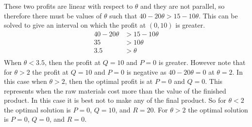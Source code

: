 \documentclass[11pt, oneside]{article}
\begin{document}
\begin{enumerate}
\begin{enumerate}
          These two profits are linear with respect to $\theta$ and they are
          not parallel, so therefore there must be values of $\theta$ such that
          $40 - 20\theta > 15 - 10\theta$.
          This can be solved to give an interval on which the profit at $(0, 10)$
          is greater.
          \begin{align*}
            40 - 20\theta &> 15 - 10\theta \\
            35 &> 10\theta \\
            3.5 &> \theta \\
          \end{align*}
          When $\theta < 3.5$, then the profit at $Q = 10$ and $P = 0$ is greater.
          However note that for $\theta > 2$ the profit at $Q = 10$ and $P = 0$
          is negative as $40 - 20\theta = 0$ at $\theta = 2$.
          In this case when $\theta > 2$, then the optimal profit is at $P = 0$
          and $Q = 0$.
          This represents when the raw materials cost more than the value of the
          finished product.
          In this case it is best not to make any of the final product.
          So for $\theta < 2$ the optimal solution is $P = 0$, $Q = 10$, and
          $R = 20$.
          For $\theta > 2$ the optimal solution is $P = 0$, $Q = 0$, and
          $R = 0$.
      \end{enumerate}
\end{enumerate}
\end{document}
